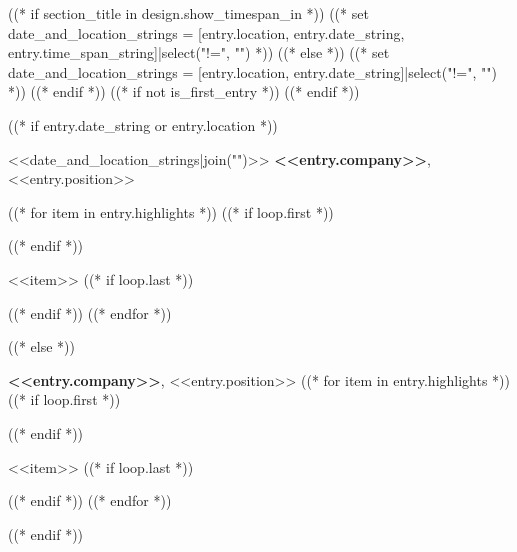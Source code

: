 ((* if section_title in design.show_timespan_in *))
    ((* set date_and_location_strings = [entry.location, entry.date_string, entry.time_span_string]|select("!=", "") *))
((* else *))
    ((* set date_and_location_strings = [entry.location, entry.date_string]|select("!=", "") *))
((* endif *))
((* if not is_first_entry *))
\vspace{<<design.margins.entry_area.vertical_between>>}
((* endif *))

((* if entry.date_string or entry.location *))
\begin{twocolentry}{
    <<date_and_location_strings|join("\n\n")>>
}
    \textbf{<<entry.company>>}, <<entry.position>>
\end{twocolentry}
\vspace {0.3 cm}
\begin{onecolentry}
    ((* for item in entry.highlights *))
        ((* if loop.first *))
    \begin{highlights}
        ((* endif *))
        \item <<item>>
        ((* if loop.last *))
    \end{highlights}
        ((* endif *))
    ((* endfor *))
\end{onecolentry}
\vspace {0.2 cm}
((* else *))
\begin{onecolentry}
    \textbf{<<entry.company>>}, <<entry.position>>
    ((* for item in entry.highlights *))
        ((* if loop.first *))
    \begin{highlights}
        ((* endif *))
        \item <<item>>
        ((* if loop.last *))
    \end{highlights}
        ((* endif *))
    ((* endfor *))
\end{onecolentry}
((* endif *))

